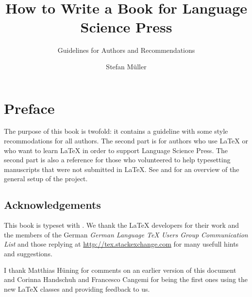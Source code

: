 \documentclass[ number=??
                ,series=lnls,
                ,isbn=xxx-x-xxxxxx-xx-x,
                ,url=http://langsci-press.org/catalog/book/14,
	        ,output=long    %
	        ,draftmode  
		  ]{langsci}
\title{How to Write a Book for Language Science Press}
\subtitle{Guidelines for Authors and \latex Recommendations}
\author{Stefan Müller}
\newcommand{\latex}{\LaTeX\xspace}
\newcommand{\lsp}{Language Science Press\xspace}
\begin{document}
               
         
                                                                           
                                  
\maketitle                


\chapter*{Preface}


The purpose of this book is twofold: it contains a guideline with some style recommodations for all
authors. The second part is for authors who use \latex or who want to learn \latex in order to
support \lsp. The second part is also a reference for those who volunteered to help typesetting
manuscripts that were not submitted in \latex. See  and  for an overview of the
general setup of the project.

\section*{Acknowledgements}




This book is typeset with \xelatex. We thank the \latex developers for their work and the members of the German \textit{German
  Language TeX Users Group Communication List} and those replying at \url{http://tex.stackexchange.com} for many usefull hints and suggestions.

I thank Matthias Hüning for comments on an earlier version of this document and Corinna Handschuh
and Francesco Cangemi for being the first ones using the new \latex classes and providing feedback
to us.

\bigskip
\end{document}
